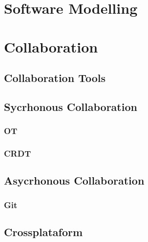 \section{Software Modelling}
\label{sec:}


\section{Collaboration}
\label{sec:}

\subsection{Collaboration Tools}
\label{subsec:}

\subsection{Sycrhonous Collaboration}
\label{subsec:}

\subsubsection{OT}

\subsubsection{CRDT}

\subsection{Asycrhonous Collaboration}
\label{subsec:}

\subsubsection{Git}


\subsection{Crossplataform}
\label{subsec:}


